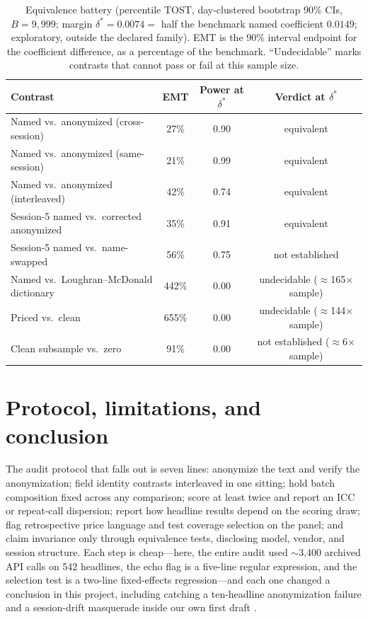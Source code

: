 \documentclass[11pt]{article}
\begin{document}
\begin{table}[t]
\centering\small
\caption{Equivalence battery (percentile TOST, day-clustered bootstrap 90\% CIs, $B=9{,}999$; margin $\delta^{*}=0.0074=$ half the benchmark named coefficient $0.0149$; exploratory, outside the declared family). EMT is the 90\% interval endpoint for the coefficient difference, as a percentage of the benchmark. ``Undecidable'' marks contrasts that cannot pass or fail at this sample size.}
\label{tab:tost}
\begin{tabular}{lccc}
\toprule
Contrast & EMT & Power at $\delta^{*}$ & Verdict at $\delta^{*}$ \\
\midrule
Named vs.\ anonymized (cross-session) & 27\% & 0.90 & equivalent \\
Named vs.\ anonymized (same-session) & 21\% & 0.99 & equivalent \\
Named vs.\ anonymized (interleaved) & 42\% & 0.74 & equivalent \\
Session-5 named vs.\ corrected anonymized & 35\% & 0.91 & equivalent \\
Session-5 named vs.\ name-swapped & 56\% & 0.75 & not established \\
Named vs.\ Loughran--McDonald dictionary & 442\% & 0.00 & undecidable ($\approx$165$\times$ sample) \\
Priced vs.\ clean & 655\% & 0.00 & undecidable ($\approx$144$\times$ sample) \\
Clean subsample vs.\ zero & 91\% & 0.00 & not established ($\approx$6$\times$ sample) \\
\bottomrule
\end{tabular}
\end{table}

\section{Protocol, limitations, and conclusion}

The audit protocol that falls out is seven lines: anonymize the text and verify the anonymization; field identity contrasts interleaved in one sitting; hold batch composition fixed across any comparison; score at least twice and report an ICC or repeat-call dispersion; report how headline results depend on the scoring draw; flag retrospective price language and test coverage selection on the panel; and claim invariance only through equivalence tests, disclosing model, vendor, and session structure. Each step is cheap---here, the entire audit used $\sim$3{,}400 archived API calls on 542 headlines, the echo flag is a five-line regular expression, and the selection test is a two-line fixed-effects regression---and each one changed a conclusion in this project, including catching a ten-headline anonymization failure and a session-drift masquerade inside our own first draft \citep{christensen2026,bisharat2026,benhenda2026}.
\end{document}
